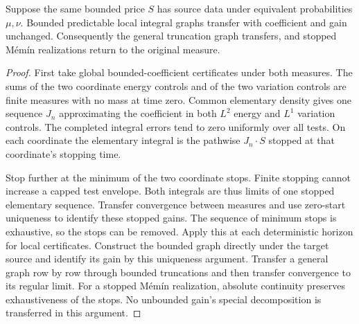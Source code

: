 \begin{proposition}
Suppose the same bounded price $S$ has source data under equivalent
probabilities $\mu,\nu$. Bounded predictable local integral graphs transfer
with coefficient and gain unchanged. Consequently the general truncation
graph transfers, and stopped Mémín realizations return to the original measure.
\end{proposition}
\begin{proof}
First take global bounded-coefficient certificates under both measures.
The sums of the two coordinate energy controls and of the two variation
controls are finite measures with no mass at time zero. Common elementary
density gives one sequence $J_n$ approximating the coefficient in both
$L^2$ energy and $L^1$ variation controls. The completed integral errors tend
to zero uniformly over all tests. On each coordinate the elementary integral
is the pathwise $J_n\cdot S$ stopped at that coordinate's stopping time.

Stop further at the minimum of the two coordinate stops. Finite stopping
cannot increase a capped test envelope. Both integrals are thus limits of
one stopped elementary sequence. Transfer convergence between measures and
use zero-start uniqueness to identify these stopped gains. The sequence of
minimum stops is exhaustive, so the stops can be removed. Apply this at each
deterministic horizon for local certificates.
Construct the bounded graph directly under the target source and identify
its gain by this uniqueness argument. Transfer a general graph row by row
through bounded truncations and then transfer convergence to its regular
limit. For a stopped Mémín realization, absolute continuity preserves
exhaustiveness of the stops. No unbounded gain's special decomposition is
transferred in this argument.
\end{proof}

